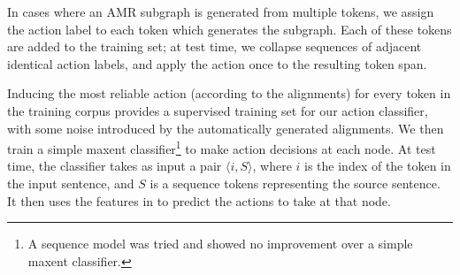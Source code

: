 \documentclass[11pt]{article}
\begin{document}
In cases where an AMR subgraph is generated from multiple tokens, we assign the
  action label to each token which generates the subgraph.
Each of these tokens are added to the training set; at test time, we collapse
  sequences of adjacent identical action labels, and apply the action once to the
  resulting token span.
  
Inducing the most reliable action (according to the alignments) for every token in the training corpus provides a supervised training set for our action classifier, with some noise introduced by the automatically generated alignments.
We then train a simple maxent classifier\footnote{A sequence model was tried and showed no improvement over a simple maxent classifier.} to make action decisions at each node.
At test time,
  the classifier takes as input a pair $\langle i, S \rangle$, where $i$ is the 
  index of the token in the input sentence, and $S$ is a sequence tokens 
  representing the source sentence.
It then uses the features in  to predict the actions to take at
  that node.



%
%
%
%





\end{document}
